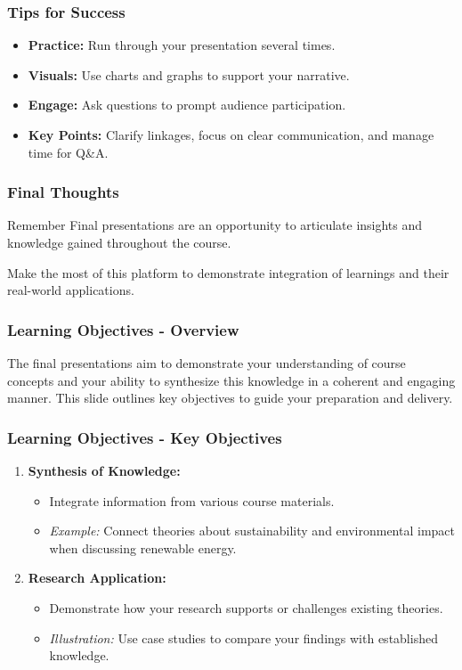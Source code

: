 \documentclass[aspectratio=169]{beamer}
\begin{document}
\begin{frame}[fragile]
    \frametitle{Tips for Success}
    \begin{itemize}
        \item \textbf{Practice:} Run through your presentation several times.
        \item \textbf{Visuals:} Use charts and graphs to support your narrative.
        \item \textbf{Engage:} Ask questions to prompt audience participation.
        \item \textbf{Key Points:} Clarify linkages, focus on clear communication, and manage time for Q&A.
    \end{itemize}
\end{frame}

\begin{frame}[fragile]
    \frametitle{Final Thoughts}
    \begin{block}{Remember}
        Final presentations are an opportunity to articulate insights and knowledge gained throughout the course.
    \end{block}
    Make the most of this platform to demonstrate integration of learnings and their real-world applications.
\end{frame}

\begin{frame}[fragile]
    \frametitle{Learning Objectives - Overview}
    The final presentations aim to demonstrate your understanding of course concepts and your ability to synthesize this knowledge in a coherent and engaging manner. 
    This slide outlines key objectives to guide your preparation and delivery.
\end{frame}

\begin{frame}[fragile]
    \frametitle{Learning Objectives - Key Objectives}
    \begin{enumerate}
        \item \textbf{Synthesis of Knowledge:}
        \begin{itemize}
            \item Integrate information from various course materials.
            \item \textit{Example:} Connect theories about sustainability and environmental impact when discussing renewable energy.
        \end{itemize}

        \item \textbf{Research Application:}
        \begin{itemize}
            \item Demonstrate how your research supports or challenges existing theories.
            \item \textit{Illustration:} Use case studies to compare your findings with established knowledge.
        \end{itemize}
    \end{enumerate}
\end{frame}
\end{document}
